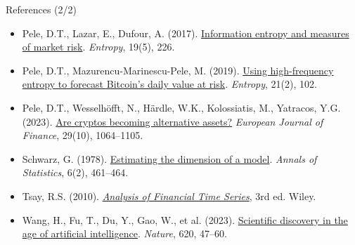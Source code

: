 \begin{frame}{References (2/2)}
\begin{itemize}
    \item Pele, D.T., Lazar, E., Dufour, A. (2017). \href{https://doi.org/10.3390/e19050226}{Information entropy and measures of market risk}. \textit{Entropy}, 19(5), 226.
    \item Pele, D.T., Mazurencu-Marinescu-Pele, M. (2019). \href{https://doi.org/10.3390/e21020102}{Using high-frequency entropy to forecast Bitcoin's daily value at risk}. \textit{Entropy}, 21(2), 102.
    \item Pele, D.T., Wesselhöfft, N., Härdle, W.K., Kolossiatis, M., Yatracos, Y.G. (2023). \href{https://doi.org/10.1080/1351847x.2021.1960403}{Are cryptos becoming alternative assets?} \textit{European Journal of Finance}, 29(10), 1064--1105.
    \item Schwarz, G. (1978). \href{https://doi.org/10.1214/aos/1176344136}{Estimating the dimension of a model}. \textit{Annals of Statistics}, 6(2), 461--464.
    \item Tsay, R.S. (2010). \href{https://doi.org/10.1002/9780470644560}{\textit{Analysis of Financial Time Series}}, 3rd ed. Wiley.
    \item Wang, H., Fu, T., Du, Y., Gao, W., et al. (2023). \href{https://doi.org/10.1038/s41586-023-06221-2}{Scientific discovery in the age of artificial intelligence}. \textit{Nature}, 620, 47--60.
\end{itemize}
\end{frame}


